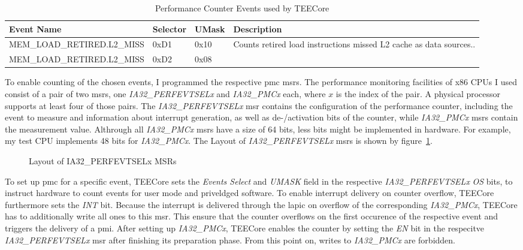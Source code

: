 \begin{table}[!h]
    \centering
    \begin{tabular}{ |p{7cm}|p{1.35cm}|p{1.25cm}|p{3cm}| }
        \hline
        Event Name                  & Selector & UMask & Description                                                        \\
        \hline
        MEM\_LOAD\_RETIRED.L2\_MISS & 0xD1     & 0x10  & Counts retired load instructions missed L2 cache as data sources.. \\
        MEM\_LOAD\_RETIRED.L2\_MISS & 0xD2     & 0x08  &                                                                    \\
        \hline
    \end{tabular}
    \caption{Performance Counter Events used by TEECore}
    \label{40:tab:events}
\end{table}

To enable counting of the chosen events, I programmed the respective \gls{pmc}
\glspl{msr}. The performance monitoring facilities of x86 CPUs I used  consist
of a pair of two \glspl{msr}, one \textit{IA32\_PERFEVTSELx} and
\textit{IA32\_PMCx} each, where $x$ is the index of the pair. A physical
processor supports at least four of those pairs. The \textit{IA32\_PERFEVTSELx}
\gls{msr} contains the configuration of the performance counter, including the
event to measure and information about interrupt generation, as well as
de-/activation bits of the counter, while \textit{IA32\_PMCx} \glspl{msr}
contain the measurement value. Althrough all \textit{IA32\_PMCx} \glspl{msr}
have a size of 64 bits, less bits might be implemented in hardware. For example,
my test CPU implements 48 bits for \textit{IA32\_PMCx}. The Layout of
\textit{IA32\_PERFEVTSELx} \glspl{msr} is shown by
figure~\ref{fig:state:technical:perfsel}.

\begin{center}
    \begin{figure}
        \centering
        
        \caption{Layout of IA32\_PERFEVTSELx MSRs}
        \label{fig:state:technical:perfsel}
    \end{figure}
\end{center}

To set up \gls{pmc} for a specific event, TEECore sets the \textit{Events
    Select} and \textit{UMASK} field in the respective
\textit{IA32\_PERFEVTSELx} \textit{OS} bits, to instruct hardware to count
events for user mode and priveldged software. To enable interrupt delivery
on counter overflow, TEECore furthermore sets the \textit{INT} bit. Because
the interrupt is delivered through the \gls{lapic} on overflow of the
corresponding \textit{IA32\_PMCx}, TEECore has to additionally write all
ones to this \gls{msr}. This ensure that the counter overflows on the first
occurence of the respective event and triggers the delivery of a \gls{pmi}.
After setting up \textit{IA32\_PMCx}, TEECore enables the counter by setting
the \textit{EN} bit in the respecitve \textit{IA32\_PERFEVTSELx} \gls{msr}
after finishing its preparation phase. From this point on, writes to
\textit{IA32\_PMCx} are forbidden.

